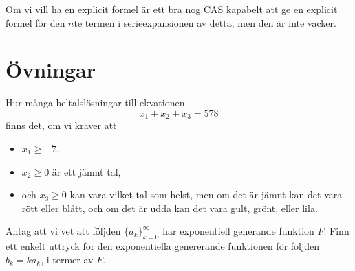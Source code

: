 \documentclass[nobib]{tufte-handout}
\begin{document}
\begin{example}
\begin{itemize}
    Om vi vill ha en explicit formel är ett bra nog CAS kapabelt att ge en explicit formel för den $n$te termen i serieexpansionen av detta, men den är inte vacker.
  \end{itemize}
\end{example}

\section{Övningar}

\begin{xca}
  Hur många heltalslösningar till ekvationen
  $$x_1 + x_2 + x_3 = 578$$
  finns det, om vi kräver att
  \begin{itemize}
    \item $x_1 \geq -7$,
    \item $x_2 \geq 0$ är ett jämnt tal,
    \item och $x_3 \geq 0$ kan vara vilket tal som helst, men om det är jämnt kan det vara rött eller blått, och om det är udda kan det vara gult, grönt, eller lila. 
  \end{itemize}
\end{xca}

\begin{xca}
  Antag att vi vet att följden $\{a_k\}_{k=0}^\infty$ har exponentiell generande funktion $F$. Finn ett enkelt uttryck för den exponentiella genererande funktionen för följden $b_k = k a_k$, i termer av $F$.
\end{xca}

%
%
\end{document}

